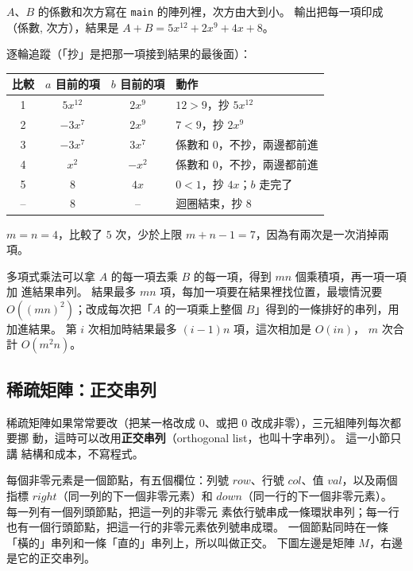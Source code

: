 $A$、$B$ 的係數和次方寫在 \texttt{main} 的陣列裡，次方由大到小。 輸出把每一項印成
（係數, 次方），結果是 $A + B = 5x^{12} + 2x^{9} + 4x + 8$。

逐輪追蹤（「抄」是把那一項接到結果的最後面）：

\begin{center}
\begin{tabular}{cccl}
\toprule
比較 & $a$ 目前的項 & $b$ 目前的項 & 動作 \\
\midrule
1 & $5x^{12}$ & $2x^{9}$ & $12 > 9$，抄 $5x^{12}$ \\
2 & $-3x^{7}$ & $2x^{9}$ & $7 < 9$，抄 $2x^{9}$ \\
3 & $-3x^{7}$ & $3x^{7}$ & 係數和 $0$，不抄，兩邊都前進 \\
4 & $x^{2}$ & $-x^{2}$ & 係數和 $0$，不抄，兩邊都前進 \\
5 & $8$ & $4x$ & $0 < 1$，抄 $4x$；$b$ 走完了 \\
-- & $8$ & -- & 迴圈結束，抄 $8$ \\
\bottomrule
\end{tabular}
\end{center}

$m = n = 4$，比較了 $5$ 次，少於上限 $m + n - 1 = 7$，因為有兩次是一次消掉兩項。

多項式乘法可以拿 $A$ 的每一項去乘 $B$ 的每一項，得到 $mn$ 個乘積項，再一項一項加
進結果串列。 結果最多 $mn$ 項，每加一項要在結果裡找位置，最壞情況要
$O((mn)^2)$；改成每次把「$A$ 的一項乘上整個 $B$」得到的一條排好的串列，用
 加進結果。 第 $i$ 次相加時結果最多 $(i-1)n$ 項，這次相加是 $O(in)$，
$m$ 次合計 $O(m^2 n)$。

\subsection{稀疏矩陣：正交串列}

稀疏矩陣如果常常要改（把某一格改成 $0$、或把 $0$ 改成非零），三元組陣列每次都要挪
動，這時可以改用\textbf{正交串列}（orthogonal list，也叫十字串列）。 這一小節只講
結構和成本，不寫程式。

每個非零元素是一個節點，有五個欄位：列號 $\mathit{row}$、行號 $\mathit{col}$、值
$\mathit{val}$，以及兩個指標 $\mathit{right}$（同一列的下一個非零元素）和
$\mathit{down}$（同一行的下一個非零元素）。 每一列有一個列頭節點，把這一列的非零元
素依行號串成一條環狀串列；每一行也有一個行頭節點，把這一行的非零元素依列號串成環。
一個節點同時在一條「橫的」串列和一條「直的」串列上，所以叫做正交。 下圖左邊是矩陣
$M$，右邊是它的正交串列。

